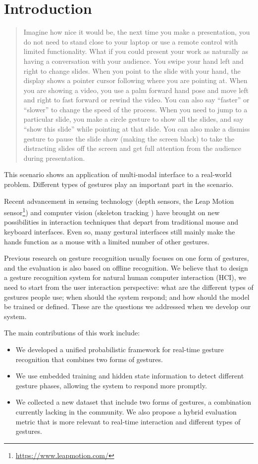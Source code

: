 \documentclass[conference]{IEEEtran}
\begin{document}
\section{Introduction}
\begin{quotation}
Imagine how nice it would be, the next time you make a presentation, you do
not need to stand close to your laptop or use a remote control with limited
functionality. What if you could present your work as naturally as having a
conversation with your audience. You swipe your hand left and right to change slides. When you point to the slide
with your hand, the display shows a pointer cursor following where you are
pointing at. When you are showing a video,
you use a palm forward hand pose and move left and right to fast forward or
rewind the video. You can also say ``faster'' or ``slower'' to change the speed
of the process. When you need to jump to a particular slide, you make a circle
gesture to show all the slides, and say ``show this
slide'' while pointing at that slide. You can also make a dismiss gesture to
pause the slide show (making the screen black) to take the distracting slides off the
screen and get full attention from the audience during presentation.
\end{quotation}

This scenario shows an application of multi-modal interface to a
real-world problem. Different types of gestures play an important part in the
scenario. 

Recent advancement in sensing technology (depth sensors, the Leap Motion
sensor\footnote{\url{https://www.leapmotion.com/}}) and computer vision
(skeleton tracking \cite{shotton13}) have brought on new possibilities in interaction techniques that depart from traditional mouse
and keyboard interfaces. Even so, many gestural
interfaces still mainly make the hands function as a mouse
with a limited number of other gestures. 

Previous research on gesture
recognition usually focuses on one form of gestures, and the evaluation is also
based on offline recognition. We believe that to design a gesture
recognition system for natural human computer interaction (HCI), we need to
start from the user interaction perspective:
what are the different types of gestures people use;
when should the system respond; and how should the model be trained or defined.
These are the questions we addressed when we develop our system.

The main contributions of this work include:
\begin{itemize}
  \item We developed a unified probabilistic framework for real-time gesture
  recognition that combines two forms of gestures.
  \item We use embedded training and hidden state information to detect
  different gesture phases, allowing the system to respond more promptly.
  \item We collected a new dataset that include two forms of gestures, a
  combination currently lacking in the community. We also propose a hybrid
  evaluation metric that is more relevant to real-time interaction and different
  types of gestures.
\end{itemize}
\end{document}

